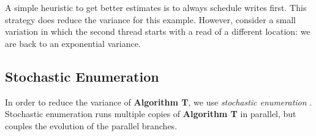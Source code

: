 \documentclass[acmsmall]{acmart}
\newcommand{\opw}{\mathsf{W}}
\begin{document}
\begin{tcolorbox}[
    colback=SkyBlue!5,
    colframe=blue!20,
    boxrule=1pt,
    arc=2pt,
    width=\textwidth,
    boxsep=5pt,
    left=5pt,
    right=5pt,
    top=5pt,
    bottom=5pt
]
\begin{minipage}[b]{0.6\textwidth}


\end{minipage}%
\end{tcolorbox}



A simple heuristic to get better estimates is to always schedule writes first.
This strategy does reduce the variance for this example.
However, consider a small variation
in which the second thread starts with a read of a different location: we are back to an exponential variance.


\subsection{Stochastic Enumeration}
\label{sec:se}
In order to reduce the variance of \textbf{Algorithm T}, we use \emph{stochastic enumeration} \cite{rubinstein,vaisman2017}.
Stochastic enumeration runs multiple copies of \textbf{Algorithm T} in parallel, but couples the evolution of the parallel branches.
\end{document}
